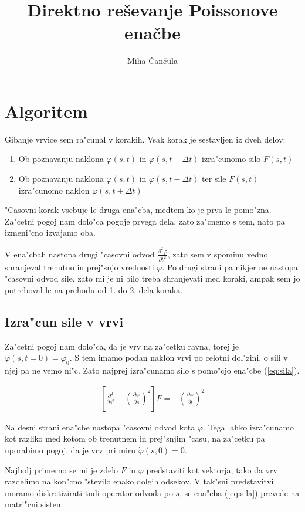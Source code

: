 \documentclass[a4paper,10pt]{article}
\title{Direktno re\v sevanje Poissonove ena\v cbe}
\author{Miha \v Can\v cula}
\renewcommand{\phi}{\varphi}
\newcommand{\parcialno}[2]{
  \frac{\partial #1}{\partial #2}
}
\newcommand{\parcdva}[2]{
  \frac{\partial^2 #1}{\partial #2 ^2}
}
\begin{document}
\maketitle

\section{Algoritem}

Gibanje vrvice sem ra"cunal v korakih. Vsak korak je sestavljen iz dveh delov:
\begin{enumerate}
 \item Ob poznavanju naklona $\phi(s,t)$ in $\phi(s,t-\Delta t)$ izra"cunomo silo $F(s,t)$
 \item Ob poznavanju naklona $\phi(s,t)$ in $\phi(s,t-\Delta t)$ ter sile $F(s,t)$ izra"cunomo naklon $\phi(s,t+\Delta t)$
\end{enumerate}

"Casovni korak vsebuje le druga ena"cba, medtem ko je prva le pomo"zna. Za"cetni pogoj nam dolo"ca pogoje prvega dela, zato za"cnemo s tem, nato pa izmeni"cno izvajamo oba. 

V ena"cbah nastopa drugi "casovni odvod $\parcdva{\phi}{t}$, zato sem v spominu vedno shranjeval trenutno in prej"snjo vrednosti $\phi$. Po drugi strani pa nikjer ne nastopa "casovni odvod sile, zato mi je ni bilo treba shranjevati med koraki, ampak sem jo potreboval le na prehodu od 1. do 2. dela koraka. 

\subsection{Izra"cun sile v vrvi}

Za"cetni pogoj nam dolo"ca, da je vrv na za"cetku ravna, torej je $\phi(s, t=0) = \phi_0$. S tem imamo podan naklon vrvi po celotni dol"zini, o sili v njej pa ne vemo ni"c. Zato najprej izra"cunamo silo s pomo"cjo ena"cbe (\ref{eq:sila}). 

\begin{align}
 \label{eq:sila}
 \left[\parcdva{}{s} - \left(\parcialno{\phi}{s}\right)^2 \right]F = -\left(\parcialno{\phi}{t}\right)^2
\end{align}

Na desni strani ena"cbe nastopa "casovni odvod kota $\phi$. Tega lahko izra"cunamo kot razliko med kotom ob trenutnem in prej"snjim "casu, na za"cetku pa uporabimo pogoj, da je vrv pri miru $\dot \phi(s,0) = 0$. 

Najbolj primerno se mi je zdelo $F$ in $\phi$ predstaviti kot vektorja, tako da vrv razdelimo na kon"cno "stevilo enako dolgih odsekov. V tak"sni predstavitvi moramo diskretizirati tudi operator odvoda po $s$, se ena"cba (\ref{eq:sila}) prevede na matri"cni sistem
\end{document}
